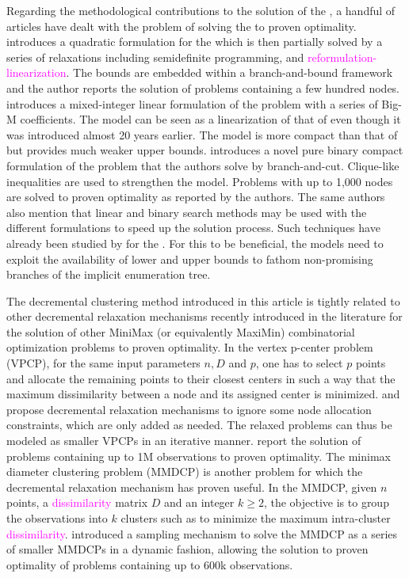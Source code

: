 \documentclass[ijoo,nonblindrev]{informs-ijoo}
\begin{document}
Regarding the methodological contributions to the solution of the \pDP{}, a handful of articles have dealt with the problem of solving the \pDP{} to proven optimality. \citet{Pisinger2006Upper} introduces a quadratic formulation for the \pDP{} which is then partially solved by a series of relaxations including semidefinite programming, and \textcolor{magenta}{reformulation-linearization}. The bounds are embedded within a branch-and-bound framework and the author reports the solution of problems containing a few hundred nodes. \citet{Kuby1987Programming} introduces a mixed-integer linear formulation of the problem with a series of Big-M coefficients. The model can be seen as a linearization of that of \citet{Pisinger2006Upper} even though it was introduced almost 20 years earlier. The model is more compact than that of \citet{Pisinger2006Upper} but provides much weaker upper bounds. \citet{Sayah2017new} introduces a novel pure binary compact formulation of the problem that the authors solve by branch-and-cut. Clique-like inequalities are used to strengthen the model. Problems with up to 1,000 nodes are solved to proven optimality as reported by the authors. The same authors also mention that linear and binary search methods may be used with the different formulations to speed up the solution process. Such techniques have already been studied by \citet{Chandrasekaran1981Location, Pisinger2006Upper} for the \pDP{}. For this to be beneficial, the models need to exploit the availability of lower and upper bounds to fathom non-promising branches of the implicit enumeration tree.

The decremental clustering method introduced in this article is tightly related to other decremental relaxation mechanisms recently introduced in the literature for the solution of other MiniMax (or equivalently MaxiMin) combinatorial optimization problems to proven optimality. In the vertex p-center problem (VPCP), for the same input parameters $n, D$ and $p$, one has to select $p$ points and allocate the remaining points to their closest centers in such a way that the maximum dissimilarity between a node and its assigned center is minimized. \citet{Chen2009New} and \citet{Contardo2019scalable} propose decremental relaxation mechanisms to ignore some node allocation constraints, which are only added as needed. The relaxed problems can thus be modeled as smaller VPCPs in an iterative manner. \citet{Contardo2019scalable} report the solution of problems containing up to 1M observations to proven optimality. The minimax diameter clustering problem (MMDCP) is another problem for which the decremental relaxation mechanism has proven useful. In the MMDCP, given $n$ points, a \textcolor{magenta}{dissimilarity} matrix $D$ and an integer $k\geq 2$, the objective is to group the observations into $k$ clusters such as to minimize the maximum intra-cluster \textcolor{magenta}{dissimilarity}. \citet{Aloise2018sampling} introduced a sampling mechanism to solve the MMDCP as a series of smaller MMDCPs in a dynamic fashion, allowing the solution to proven optimality of problems containing up to 600k observations.
\end{document}
